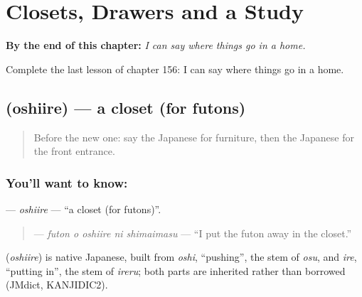 
\chapter{Closets, Drawers and a Study}
\label{ch:ja-closets-drawers-and-a-study}

\begin{chapteropening}
\textbf{By the end of this chapter:} \emph{I can say where things go in a home.}

Complete the last lesson of chapter 156: I can say where things go in a home.
\end{chapteropening}

\section[\texorpdfstring{\ja{おしいれ} (oshiire)}{おしいれ (oshiire)}]{ (oshiire) — a closet (for futons)}

\label{lesson:JA-C156-oshiire}



\begin{quote}
Before the new one: say the Japanese for furniture, then the Japanese for the front entrance.
\end{quote}

\subsection*{You'll want to know: }
\textbf{} — \emph{oshiire} — \textquotedblleft{}a closet (for futons)\textquotedblright{}.

\begin{quote}
\textbf{  } — \emph{futon o oshiire ni shimaimasu} — \textquotedblleft{}I put the futon away in the closet.\textquotedblright{}
\end{quote}

\begin{cousinweb}
\textbf{} (\emph{oshiire}) is native Japanese, built from \emph{oshi}, \textquotedblleft{}pushing\textquotedblright{}, the stem of \emph{osu}, and \emph{ire}, \textquotedblleft{}putting in\textquotedblright{}, the stem of \emph{ireru}; both parts are inherited rather than borrowed (JMdict, KANJIDIC2).
\end{cousinweb}

